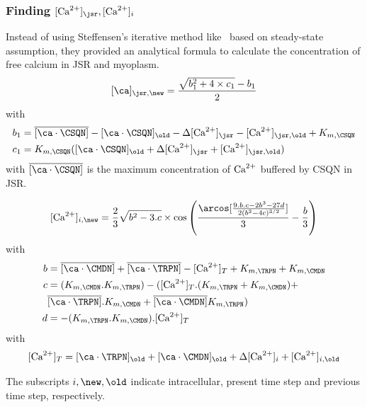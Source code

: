 \subsubsection{Finding $[\Ca]_\jsr, [\Ca]_i$}
\label{sec:finding-ca_jsr-ca_i}


Instead of using Steffensen's iterative method
like~\citep{luo1994dmc_a} based on steady-state assumption, they provided
an analytical formula to calculate the concentration of free calcium
in JSR and myoplasm.
\begin{equation}
  \label{eq:1296}
  [\ca]_{\jsr,\new} = \frac{\sqrt{b_1^2 + 4\times c_1} - b_1}{2}
\end{equation}
with
\begin{equation}
  \label{eq:1297}
  \begin{split}
    b_1 &= \overline{[\ca\cdot\CSQN]}-[\ca\cdot\CSQN]_\old - \Delta
    [\Ca]_\jsr - [\Ca]_{\jsr,\old}+K_{m,\CSQN} \\
    c_1 &= K_{m,\CSQN}([\ca\cdot\CSQN]_\old+\Delta [\Ca]_\jsr + [\Ca]_{\jsr,\old})
  \end{split}
\end{equation}
with $\overline{[\ca\cdot\CSQN]}$ is the maximum concentration of ${\text{Ca}^{2+}}$
 buffered by CSQN in JSR. 


 \begin{equation}
   \label{eq:1298}
   [\Ca]_{i,\new} = \frac{2}{3}\sqrt{b^2-3.c}\times \cos\left( \frac{\arcos[\frac{9.b.c-2b^3-27d}{2(b^2-4c)^{3/2}}]}{3}-\frac{b}{3}\right)
 \end{equation}
with
\begin{equation}
  \label{eq:1299}
  \begin{split}
    b &=\overline{[\ca\cdot\CMDN]} + \overline{[\ca\cdot\TRPN]} - [\Ca]_T +
    K_{m,\TRPN} + K_{m,\CMDN}  \\
    c&=(K_{m,\CMDN}.K_{m,\TRPN})- ( [\Ca]_T .(
    K_{m,\TRPN} + K_{m,\CMDN}) + \\
    &\overline{[\ca\cdot\TRPN]}.K_{m,\CMDN} + \overline{[\ca\cdot\CMDN]}
    K_{m,\TRPN})  \\
    d&= -(K_{m,\TRPN}.K_{m,\CMDN}).[\Ca]_T
  \end{split}
\end{equation}
with 
\begin{equation}
  \label{eq:1300}
  [\Ca]_T = [\ca\cdot\TRPN]_\old + [\ca\cdot\CMDN]_\old + \Delta
  [\Ca]_i + [\Ca]_{i,\old}
\end{equation}

The subscripts $i,\new,\old$ indicate intracellular, present time step
and previous time step, respectively. 

